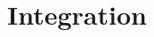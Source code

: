 \documentclass[../main.tex]{subfiles}
\begin{document}
\section{Integration}

\subsection{}

\subsubsection{}
\end{document}
